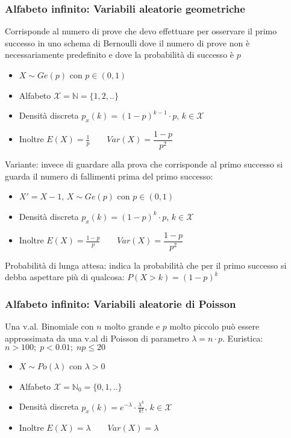 \documentclass[10pt,a4paper]{article}
\begin{document}
\begin{multicols}{2}
\subsubsection*{Alfabeto infinito: Variabili aleatorie geometriche}
Corrisponde al numero di prove che devo effettuare per osservare il primo successo in uno schema di Bernoulli dove il numero di prove non è necessariamente predefinito e dove la probabilità di successo è $p$
\begin{itemize}
    \item $X\sim Ge(p)$ con $p \in (0, 1)$ 
    \item Alfabeto $\mathcal{X} = \mathbb{N} = \{1,2,..\}$
    \item Densità discreta $p_x(k) =(1-p)^{k-1}\cdot p$, $k \in \mathcal{X}$
    \item Inoltre $E(X) = \frac{1}{p} \qquad Var(X) = \dfrac{1-p}{p^2}$
\end{itemize}
Variante: invece di guardare alla prova che corrisponde al primo successo si guarda il numero di fallimenti prima del primo successo:
\begin{itemize}
    \item $X'=X-1, \, X\sim Ge(p)$ con $p \in (0, 1)$ 
    \item Densità discreta $p_x(k) =(1-p)^{k}\cdot p$, $k \in \mathcal{X}$
    \item Inoltre $E(X) = \frac{1-p}{p} \qquad Var(X) = \dfrac{1-p}{p^2}$
\end{itemize}
Probabilità di lunga attesa: indica la probabilità che per il primo successo si debba aspettare più di qualcosa: $P(X > k) = (1-p)^k$ 
\subsubsection*{Alfabeto infinito: Variabili aleatorie di Poisson}
Una v.al. Binomiale con $n$ molto grande e $p$ molto piccolo può essere approssimata da una v.al di Poisson di parametro $\lambda = n\cdot p$.
Euristica: $n > 100;\; p < 0.01;\; np \leq 20$
\begin{itemize}
    \item $X\sim Po(\lambda)$ con $\lambda > 0$ 
    \item Alfabeto $\mathcal{X} = \mathbb{N}_0 = \{0,1,..\}$
    \item Densità discreta $p_x(k) =e^{-\lambda}\cdot\frac{\lambda^k}{k!}$, $k \in \mathcal{X}$
    \item Inoltre $E(X) = \lambda \qquad Var(X) = \lambda$
\end{itemize}



\end{multicols}
\end{document}
